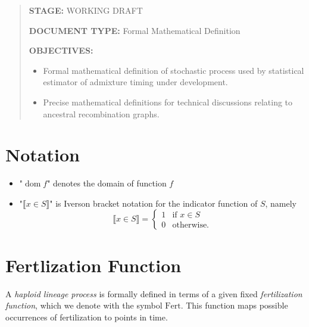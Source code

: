 




\newcommand{\mathstop}{\text{ .}}
\renewcommand{\Pr}{\operatorname{\mathbb{P}}}
\newcommand{\dom}{\operatorname{dom}}
\newcommand{\Tim}{\mathrm{Tim}}
\newcommand{\Hap}{\mathrm{Hap}}
\newcommand{\Dip}{\mathrm{Dip}}
\newcommand{\Par}{\mathrm{Par}}
\newcommand{\Pat}{\mathrm{Pat}}
\newcommand{\Fert}{\mathrm{Fert}}
\newcommand{\Loc}{\mathrm{Loc}}
\newcommand{\Lin}{\mathrm{Lin}}
\newcommand{\Leg}{\mathrm{Leg}}
\newcommand{\Nodes}{\mathrm{Nodes}}


\begin{abstract}
\textbf{STAGE:} WORKING DRAFT

\textbf{DOCUMENT TYPE:} Formal Mathematical Definition

\textbf{OBJECTIVES:}

\begin{itemize}
\item
  Formal mathematical definition of stochastic process used by
  statistical estimator of admixture timing under development.
\item
  Precise mathematical definitions for technical discussions relating to
  ancestral recombination graphs.
\end{itemize}
\end{abstract}


\section{Notation}

\begin{itemize}
\item
  "$\dom f$" denotes the domain of function $f$
\item
  "$⟦ x \in S ⟧$" is Iverson bracket notation for the indicator function of $S$, namely
$$
⟦ x \in S ⟧ =
  \begin{cases}
    1 & \text{if } x \in S  \\
    0 & \text{otherwise.}
  \end{cases}
$$

\end{itemize}


\section{Fertlization Function}

A \emph{haploid lineage process} is formally defined in terms of a given
fixed \emph{fertilization function}, which we denote with the symbol $\Fert$. This
function maps possible occurrences of fertilization to points in time.

